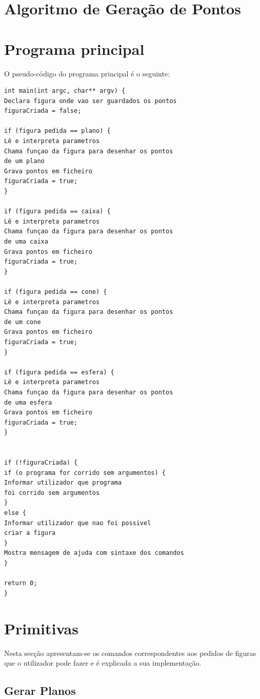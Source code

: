 \section{Algoritmo de Geração de Pontos}


\section{Programa principal}

O pseudo-código do programa principal é o seguinte:


\begin{Verbatim}
int main(int argc, char** argv) {
Declara figura onde vao ser guardados os pontos
figuraCriada = false;

if (figura pedida == plano) {
Lê e interpreta parametros
Chama funçao da figura para desenhar os pontos 
de um plano
Grava pontos em ficheiro
figuraCriada = true;
}

if (figura pedida == caixa) {
Lê e interpreta parametros
Chama funçao da figura para desenhar os pontos
de uma caixa
Grava pontos em ficheiro
figuraCriada = true;
}

if (figura pedida == cone) {
Lê e interpreta parametros
Chama funçao da figura para desenhar os pontos 
de um cone
Grava pontos em ficheiro
figuraCriada = true;
}

if (figura pedida == esfera) {
Lê e interpreta parametros
Chama funçao da figura para desenhar os pontos
de uma esfera
Grava pontos em ficheiro
figuraCriada = true;
}


if (!figuraCriada) {
if (o programa for corrido sem argumentos) {
Informar utilizador que programa 
foi corrido sem argumentos
}
else {
Informar utilizador que nao foi possivel
criar a figura
}
Mostra mensagem de ajuda com sintaxe dos comandos
}

return 0;
}
\end{Verbatim}

\section{Primitivas}

Nesta secção apresentam-se os comandos correspondentes aos pedidos de figuras que o utilizador pode fazer e é explicada a sua implementação.

\subsection{Gerar Planos}
\label{p1:planos}


